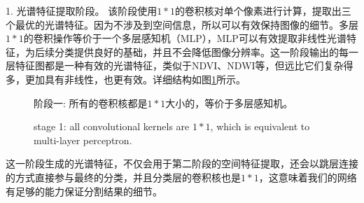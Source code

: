 \documentclass[10pt,UTF8,fntef]{ctexart}
\begin{document}
\begin{multicols}{2} 
1. 光谱特征提取阶段。 该阶段使用$1*1$的卷积核对单个像素进行计算，提取出三个最优的光谱特征。因为不涉及到空间信息，所以可以有效保持图像的细节。多层$1*1$的卷积操作等价于一个多层感知机（MLP），MLP可以有效提取非线性光谱特征，为后续分类提供良好的基础，并且不会降低图像分辨率。这一阶段输出的每一层特征图都是一种有效的光谱特征，类似于NDVI、NDWI等，但远比它们复杂得多，更加具有非线性，也更有效。详细结构如图\ref{pic:straight}所示。

\begin{figure}[H]
    \centering
    \caption[]{阶段一: 所有的卷积核都是$1*1$大小的，等价于多层感知机。}
    \addtocounter{figure}{-1}
    \vspace{-5pt}
    \renewcommand{\figurename}{Fig}
    \caption{stage 1: all convolutional kernels are $1*1$, which is equivalent to multi-layer perceptron.}
    \renewcommand{\figurename}{图}
    \label{pic:straight}
\end{figure}

这一阶段生成的光谱特征，不仅会用于第二阶段的空间特征提取，还会以跳层连接的方式直接参与最终的分类，并且分类层的卷积核也是$1*1$，这意味着我们的网络有足够的能力保证分割结果的细节。


\end{multicols}
\end{document}
